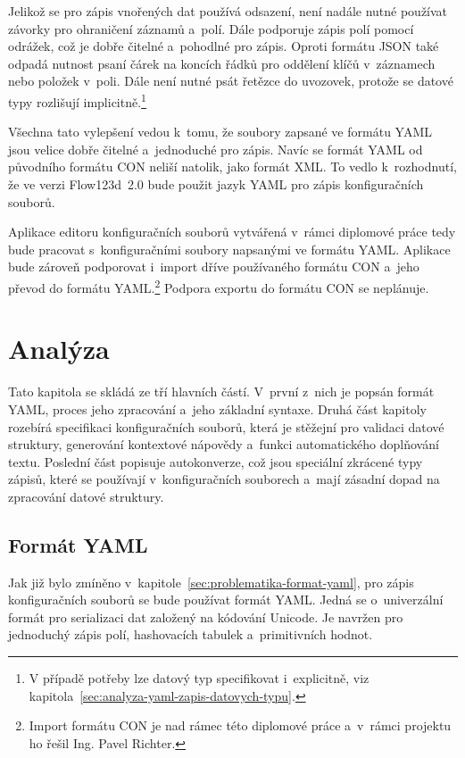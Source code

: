 \documentclass[FM,bw,DP]{tulthesis}
\begin{document}
Jelikož se pro zápis vnořených dat používá odsazení, není nadále nutné používat závorky pro ohraničení záznamů a~polí. Dále podporuje zápis polí pomocí odrážek, což je dobře čitelné a~pohodlné pro zápis. Oproti formátu \gls{JSON} také odpadá nutnost psaní čárek na koncích řádků pro oddělení klíčů v~záznamech nebo položek v~poli. Dále není nutné psát řetězce do uvozovek, protože se datové typy rozlišují implicitně.\footnote{V případě potřeby lze datový typ specifikovat i~explicitně, viz kapitola~\ref{sec:analyza-yaml-zapis-datovych-typu}.}

Všechna tato vylepšení vedou k~tomu, že soubory zapsané ve formátu \gls{YAML} jsou velice dobře čitelné a~jednoduché pro zápis. Navíc se formát \gls{YAML} od původního formátu \gls{CON} neliší natolik, jako formát \gls{XML}. To vedlo k~rozhodnutí, že ve verzi Flow123d~2.0 bude použit jazyk \gls{YAML} pro zápis konfiguračních souborů.

Aplikace editoru konfiguračních souborů vytvářená v~rámci diplomové práce tedy bude pracovat s~konfiguračními soubory napsanými ve formátu \gls{YAML}. Aplikace bude zároveň podporovat i~import dříve používaného formátu \gls{CON} a~jeho převod do formátu \gls{YAML}.\footnote{Import formátu CON je nad rámec této diplomové práce a~v~rámci projektu ho řešil Ing. Pavel Richter.} Podpora exportu do formátu \gls{CON} se neplánuje.


\chapter{Analýza}

Tato kapitola se skládá ze tří hlavních částí. V~první z~nich je popsán formát \gls{YAML}, proces jeho zpracování a~jeho základní syntaxe. Druhá část kapitoly rozebírá specifikaci konfiguračních souborů, která je stěžejní pro validaci datové struktury, generování kontextové nápovědy a~funkci automatického doplňování textu. Poslední část popisuje autokonverze, což jsou speciální zkrácené typy zápisů, které se používají v~konfiguračních souborech a~mají zásadní dopad na zpracování datové struktury.


\section{Formát YAML}
Jak již bylo zmíněno v~kapitole~\ref{sec:problematika-format-yaml}, pro zápis konfiguračních souborů se bude používat formát \gls{YAML}. Jedná se o~univerzální formát pro serializaci dat založený na kódování Unicode. Je navržen pro jednoduchý zápis polí, hashovacích tabulek a~primitivních hodnot.
\end{document}
